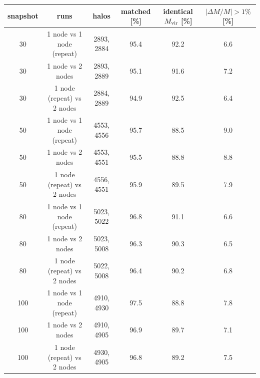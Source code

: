 \begin{tabular}{cccccc}
\toprule
snapshot & runs & halos & matched [\%] & identical $M_{\rm vir}$ [\%] & $|\Delta M/M|>1\%$ [\%] \\
\midrule
30 & 1 node vs 1 node (repeat) & 2893, 2884 & 95.4 & 92.2 & 6.6 \\
30 & 1 node vs 2 nodes & 2893, 2889 & 95.1 & 91.6 & 7.2 \\
30 & 1 node (repeat) vs 2 nodes & 2884, 2889 & 94.9 & 92.5 & 6.4 \\
\midrule
50 & 1 node vs 1 node (repeat) & 4553, 4556 & 95.7 & 88.5 & 9.0 \\
50 & 1 node vs 2 nodes & 4553, 4551 & 95.5 & 88.8 & 8.8 \\
50 & 1 node (repeat) vs 2 nodes & 4556, 4551 & 95.9 & 89.5 & 7.9 \\
\midrule
80 & 1 node vs 1 node (repeat) & 5023, 5022 & 96.8 & 91.1 & 6.6 \\
80 & 1 node vs 2 nodes & 5023, 5008 & 96.3 & 90.3 & 6.5 \\
80 & 1 node (repeat) vs 2 nodes & 5022, 5008 & 96.4 & 90.2 & 6.8 \\
\midrule
100 & 1 node vs 1 node (repeat) & 4910, 4930 & 97.5 & 88.8 & 7.8 \\
100 & 1 node vs 2 nodes & 4910, 4905 & 96.9 & 89.7 & 7.1 \\
100 & 1 node (repeat) vs 2 nodes & 4930, 4905 & 96.8 & 89.2 & 7.5 \\
\bottomrule
\end{tabular}
